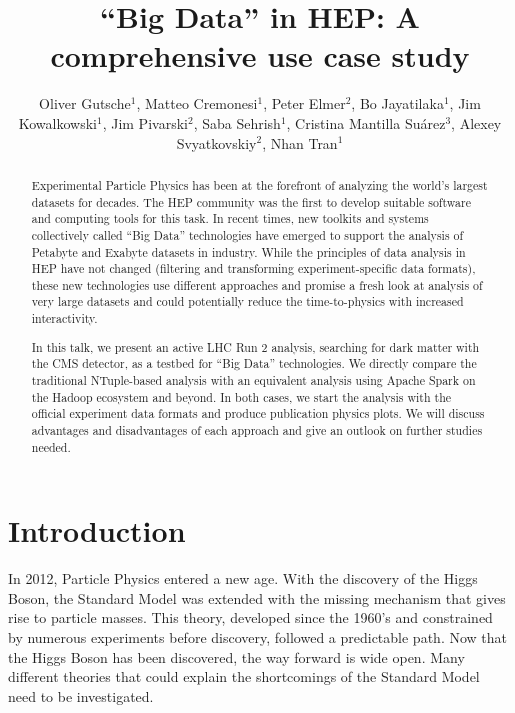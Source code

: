 \documentclass[a4paper]{jpconf}
\begin{document}
\title{“Big Data” in HEP: A comprehensive use case study}

\author{Oliver Gutsche$^1$, Matteo Cremonesi$^1$, Peter Elmer$^2$, Bo Jayatilaka$^1$, Jim Kowalkowski$^1$, Jim Pivarski$^2$, Saba Sehrish$^1$, Cristina Mantilla Suárez$^3$, Alexey Svyatkovskiy$^2$, Nhan Tran$^1$}

\address{$^1$Fermi National Accelerator Laboratory, Batavia, IL, USA}
\address{$^2$Princeton University, Princeton, NJ, USA}
\address{$^3$Fermi National Accelerator Laboratory, Batavia, IL, USA; now Johns Hopkins University, Baltimore, MD, USA}


\begin{abstract}
Experimental Particle Physics has been at the forefront of analyzing the world’s largest datasets for decades. The HEP community was the first to develop suitable software and computing tools for this task. In recent times, new toolkits and systems collectively called “Big Data” technologies have emerged to support the analysis of Petabyte and Exabyte datasets in industry. While the principles of data analysis in HEP have not changed (filtering and transforming experiment-specific data formats), these new technologies use different approaches and promise a fresh look at analysis of very large datasets and could potentially reduce the time-to-physics with increased interactivity.
%

In this talk, we present an active LHC Run 2 analysis, searching for dark matter with the CMS detector, as a testbed for “Big Data” technologies. We directly compare the traditional NTuple-based analysis with an equivalent analysis using Apache Spark on the Hadoop ecosystem and beyond. In both cases, we start the analysis with the official experiment data formats and produce publication physics plots. We will discuss advantages and disadvantages of each approach and give an outlook on further studies needed.
\end{abstract}

\section{Introduction}

In 2012, Particle Physics entered a new age. With the discovery of the Higgs Boson, the Standard Model was extended with the missing mechanism that gives rise to particle masses. This theory, developed since the 1960's and constrained by numerous experiments before discovery, followed a predictable path. Now that the Higgs Boson has been discovered, the way forward is wide open. Many different theories that could explain the shortcomings of the Standard Model need to be investigated.
\end{document}
